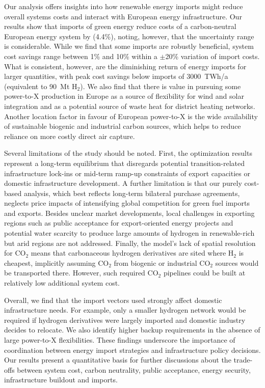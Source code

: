 Our analysis offers insights into how renewable energy imports might reduce
overall systems costs and interact with European energy infrastructure. Our
results show that imports of green energy reduce costs of a carbon-neutral
European energy system by  (4.4\%), noting, however, that the
uncertainty range is considerable. While we find that some imports are robustly
beneficial, system cost savings range between 1\% and 10\% within a $\pm$20\%
variation of import costs. What is consistent, however, are the diminishing
return of energy imports for larger quantities, with peak cost savings below
imports of 3000~TWh/a (equivalent to 90~Mt H$_2$). We also find that there is
value in pursuing some \mbox{power-to-X} production in Europe as a source of
flexibility for wind and solar integration and as a potential source of waste
heat for district heating networks. Another location factor in favour of
European \mbox{power-to-X} is the  wide availability of sustainable biogenic and
industrial carbon sources, which helps to reduce reliance on more costly direct
air capture.


Several limitations of the study should be noted. First, the optimization
results represent a long-term equilibrium that disregards potential
transition-related infrastructure lock-ins or mid-term ramp-up constraints of
export capacities or domestic infrastructure development. A further limitation
is that our purely cost-based analysis, which best reflects long-term bilateral
purchase agreements, neglects price impacts of intensifying global competition
for green fuel imports and exports. Besides unclear market developments, local
challenges in exporting regions such as public acceptance for export-oriented
energy projects\cite{ishmamMappingLocalGreen2024} and potential water
scarcity\cite{franzmannGreenHydrogenCostpotentials2023,terlouwFutureHydrogenEconomies2024} to produce large amounts of
hydrogen in renewable-rich but arid regions are not addressed. Finally, the
model's lack of spatial resolution for CO$_2$ means that carbonaceous hydrogen
derivatives are sited where H$_2$ is cheapest, implicitly assuming CO$_2$ from
biogenic or industrial CO$_2$ sources would be transported there. However, such
required CO$_2$ pipelines could be built at relatively low additional system
cost.\cite{hofmannH2CO2Network2024}

Overall, we find that the import vectors used strongly affect domestic
infrastructure needs. For example, only a smaller hydrogen network would be
required if hydrogen derivatives were largely imported and domestic industry
decides to relocate. We also identify higher backup requirements in the absence
of large power-to-X flexibilities. These findings underscore the importance of
coordination between energy import strategies and infrastructure policy
decisions. Our results present a quantitative basis for further discussions
about the trade-offs between system cost, carbon neutrality, public acceptance,
energy security, infrastructure buildout and imports.

